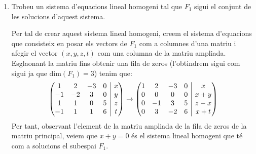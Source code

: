 \documentclass[11pt,a4paper]{article}
\newcommand{\rvline}{\hspace*{-\arraycolsep}\vline\hspace*{-\arraycolsep}}
\begin{document}
\begin{enumerate}
\begin{enumerate}
        \item Trobeu un sistema d’equacions lineal homogeni tal que $F_1$ sigui el conjunt de les solucions d’aquest sistema.\par
       Per tal de crear aquest sistema lineal homogeni, creem el sistema d'equacions que consisteix en posar els vectors  de $F_1$ com a columnes d'una matriu i afegir el vector $(x,y,z,t)$ com una columna de la matriu ampliada. Esglaonant la matriu fins obtenir una fila de zeros (l'obtindrem sigui com sigui ja que $\text{dim} (F_1)=3$) tenim que:
       \begin{equation*}
            \begin{pmatrix}\begin{matrix}
              1 & 2 & -3 & 0 \\
              -1 & -2 & 3 & 0 \\
              1 & 1 & 0 & 5 \\
              -1 & 1 & 1 & 6 \\
              \end{matrix} & \rvline & \begin{matrix}
              x\\
              y\\
              z\\
              t\\
              \end{matrix}
           \end{pmatrix}\rightarrow\begin{pmatrix}\begin{matrix}
              1 & 2 & -3 & 0 \\
              0 & 0 & 0 & 0 \\
              0 & -1 & 3 & 5 \\
              0 & 3 & -2 & 6 \\
              \end{matrix} & \rvline & \begin{matrix}
              x\\
              x+y\\
              z-x\\
              x+t\\
              \end{matrix}
           \end{pmatrix}
        \end{equation*}
        Per tant, observant l'element de la matriu ampliada de la fila de zeros de la matriu principal, veiem que $x+y=0$ és el sistema lineal homogeni que té com a solucions el subespai $F_1$. 
    \end{enumerate}
    

\end{enumerate}
\end{document}
